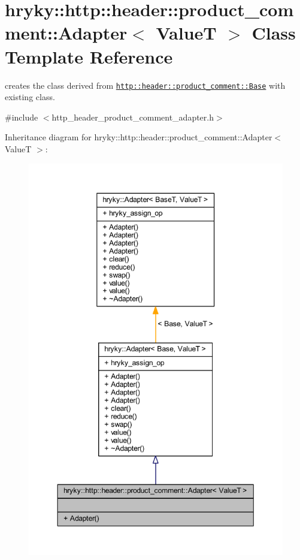 \hypertarget{classhryky_1_1http_1_1header_1_1product__comment_1_1_adapter}{\section{hryky\-:\-:http\-:\-:header\-:\-:product\-\_\-comment\-:\-:Adapter$<$ Value\-T $>$ Class Template Reference}
\label{classhryky_1_1http_1_1header_1_1product__comment_1_1_adapter}
}


creates the class derived from \href{http::header::product_comment::Base}{\tt http\-::header\-::product\-\_\-comment\-::\-Base} with existing class.  




{\ttfamily \#include $<$http\-\_\-header\-\_\-product\-\_\-comment\-\_\-adapter.\-h$>$}



Inheritance diagram for hryky\-:\-:http\-:\-:header\-:\-:product\-\_\-comment\-:\-:Adapter$<$ Value\-T $>$\-:
\nopagebreak
\begin{figure}[H]
\begin{center}
\leavevmode
\includegraphics[width=350pt]{classhryky_1_1http_1_1header_1_1product__comment_1_1_adapter__inherit__graph}
\end{center}
\end{figure}
